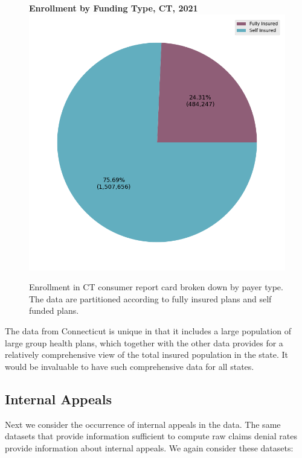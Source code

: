 \documentclass[12pt, a4paper,twoside]{report}
\theoremstyle{plain} %
\theoremstyle{definition} %
\theoremstyle{remark} %
\numberwithin{equation}{chapter}
\begin{document}
		\begin{figure}[h!]
			\centering
			\textbf{Enrollment by Funding Type, CT, 2021}
			\includegraphics[width=\columnwidth]{images/ct_claims/enrollment_by_payer_type.png}
			\caption{Enrollment in CT consumer report card broken down by payer type. The data are partitioned according to fully insured plans and self funded plans.}
			\label{ctenrollmentbyfundingtype}
		\end{figure}
	
		The data from Connecticut is unique in that it includes a large population of large group health plans, which together with the other data provides for a relatively comprehensive view of the total insured population in the state. It would be invaluable to have such comprehensive data for all states.
		
		
		
		\subsection{Internal Appeals}\label{publicdata:internalappeals}
		
		Next we consider the occurrence of internal appeals in the data. The same datasets that provide information sufficient to compute raw claims denial rates provide information about internal appeals. We again consider these datasets:
		
\end{document}
